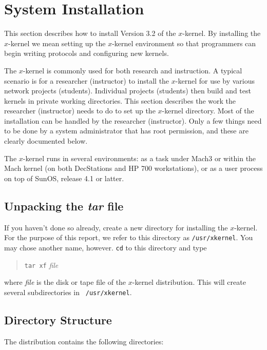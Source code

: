 
\section{System Installation}

This section describes how to install Version 3.2 of the $x$-kernel.
By installing the $x$-kernel we mean setting up the $x$-kernel
environment so that programmers can begin writing protocols and
configuring new kernels.

The $x$-kernel is commonly used for both research and instruction.  A
typical scenario is for a researcher (instructor) to install the
$x$-kernel for use by various network projects (students). Individual
projects (students) then build and test kernels in private working
directories. This section
describes the work the researcher (instructor) needs to do to set up
the $x$-kernel directory.  Most of the installation can be handled by
the researcher (instructor).  Only a few things need to be done by a
system administrator that has root permission, and these are clearly
documented below.

The $x$-kernel runs in several environments: as a task under
Mach3 or within the Mach kernel (on both DecStations and HP 700
workstations),  or as a user process on top of SunOS, release
4.1 or latter.

\subsection{Unpacking the {\it tar} file}

If you haven't done so already, create a new directory for installing
the $x$-kernel.  For the purpose of this report, we refer to this
directory as {\tt /usr/xkernel}.  You may chose another name, however.
{\tt cd} to this directory and type

\begin{quote}
{\tt tar xf} {\it file}
\end{quote}

\noindent where {\it file} is the disk or tape file of the $x$-kernel
distribution. This will create several subdirectories in {\tt
/usr/xkernel}. 


\subsection{Directory Structure}

The distribution contains the following directories:

